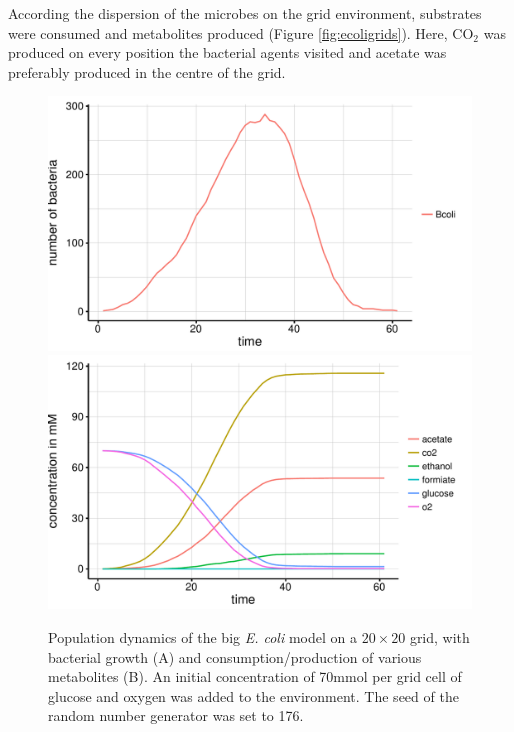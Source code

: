 According the dispersion of the microbes on the grid environment, substrates were consumed and metabolites produced (Figure \hyperref[fig:ecoligrids]{\ref{fig:ecoligrids}}). Here, CO$_2$ was produced on every position the bacterial agents visited and  acetate was preferably produced in the centre of the grid.
\begin{figure}[h!]
  \centering
    \includegraphics[scale=0.45]{../results/Bcoli_20x20_seed176_growth.pdf}
    \includegraphics[scale=0.45]{../results/Bcoli_20x20_seed176_subs.pdf}
  \caption{Population dynamics of the big \emph{E. coli} model on a $20\times20$ grid, with bacterial growth (A) and consumption/production of various metabolites (B). An initial concentration of 70\;mmol per grid cell of glucose and oxygen was added to the environment. The seed of the random number generator was set to 176.}
  \label{fig:ecolisg}
\end{figure}
